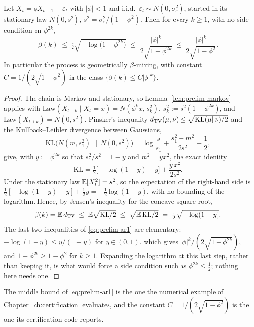 \documentclass[../../../main.tex]{subfiles}
\begin{document}
\begin{proposition}[Gaussian AR(1)]\label{prop:prelim-ar1}
Let $X_t=\phi X_{t-1}+\varepsilon_t$ with $|\phi|<1$ and i.i.d.\ $\varepsilon_t\sim N(0,\sigma_\varepsilon^2)$, started in its stationary law $N(0,s^2)$, $s^2=\sigma_\varepsilon^2/(1-\phi^2)$. Then for every $k\ge1$, with no side condition on $\phi^{2k}$,
\begin{equation}\label{eq:prelim-ar1}
\beta(k)\;\le\;\tfrac12\sqrt{-\log\big(1-\phi^{2k}\big)}\;\le\;\frac{|\phi|^k}{2\sqrt{1-\phi^{2k}}}\;\le\;\frac{|\phi|^k}{2\sqrt{1-\phi^{2}}} .
\end{equation}
In particular the process is geometrically $\beta$-mixing, with constant $C=1/(2\sqrt{1-\phi^2})$ in the class $\{\beta(k)\le C|\phi|^k\}$.
\end{proposition}

\begin{proof}
The chain is Markov and stationary, so Lemma~\ref{lem:prelim-markov} applies with $\mathrm{Law}(X_{t+k}\mid X_t=x)=N(\phi^kx,\,s_k^2)$, $s_k^2:=s^2(1-\phi^{2k})$, and $\mathrm{Law}(X_{t+k})=N(0,s^2)$. Pinsker's inequality $d_{\mathrm{TV}}(\mu,\nu)\le\sqrt{\mathrm{KL}(\mu\|\nu)/2}$ \cite[Lemma~2.5]{tsybakov2009} and the Kullback--Leibler divergence between Gaussians,
\[
\mathrm{KL}\big(N(m,s_1^2)\,\big\|\,N(0,s^2)\big)=\log\frac{s}{s_1}+\frac{s_1^2+m^2}{2s^2}-\frac12,
\]
give, with $y:=\phi^{2k}$ so that $s_1^2/s^2=1-y$ and $m^2=yx^2$, the exact identity
\[
\mathrm{KL}=\tfrac12\big[-\log(1-y)-y\big]+\frac{y\,x^2}{2s^2} .
\]
Under the stationary law $\mathbb{E}[X_t^2]=s^2$, so the expectation of the right-hand side is $\tfrac12[-\log(1-y)-y]+\tfrac12y=-\tfrac12\log(1-y)$, with no bounding of the logarithm. Hence, by Jensen's inequality for the concave square root,
\[
\beta(k)=\mathbb{E}\,d_{\mathrm{TV}}\;\le\;\mathbb{E}\sqrt{\mathrm{KL}/2}\;\le\;\sqrt{\mathbb{E}\,\mathrm{KL}/2}\;=\;\tfrac12\sqrt{-\log(1-y)} .
\]
The last two inequalities of \eqref{eq:prelim-ar1} are elementary: $-\log(1-y)\le y/(1-y)$ for $y\in(0,1)$, which gives $|\phi|^k/(2\sqrt{1-\phi^{2k}})$, and $1-\phi^{2k}\ge1-\phi^2$ for $k\ge1$. Expanding the logarithm at this last step, rather than keeping it, is what would force a side condition such as $\phi^{2k}\le\tfrac12$; nothing here needs one.
\end{proof}

The middle bound of \eqref{eq:prelim-ar1} is the one the numerical example of Chapter~\ref{ch:certification} evaluates, and the constant $C=1/(2\sqrt{1-\phi^2})$ is the one its certification code reports.
\end{document}
